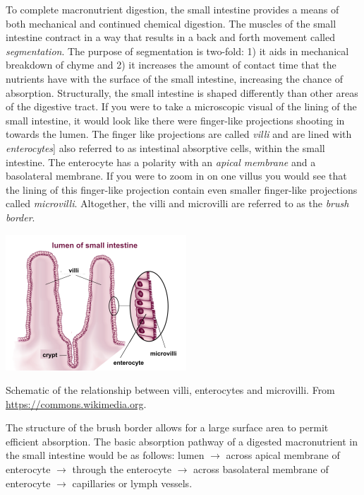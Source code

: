 \documentclass{tufte-handout}
\begin{document}
To complete macronutrient digestion, the small intestine provides a means of both mechanical and continued chemical digestion. The muscles of the small intestine contract in a way that results in a back and forth movement called \emph{segmentation}. The purpose of segmentation is two-fold: 1) it aids in mechanical breakdown of chyme and 2) it increases the amount of contact time that the nutrients have with the surface of the small intestine, increasing the chance of absorption. Structurally, the small intestine is shaped differently than other areas of the digestive tract. If you were to take a microscopic visual of the lining of the small intestine, it would look like there were finger-like projections shooting in towards the lumen. The finger like projections are called \emph{villi} and are lined with \emph{enterocytes}] also referred to as intestinal absorptive cells, within the small intestine. The enterocyte has a polarity with an \emph{apical membrane} and a basolateral membrane. If you were to zoom in on one villus you would see that the lining of this finger-like projection contain even smaller finger-like projections called \emph{microvilli}. Altogether, the villi and microvilli are referred to as the \emph{brush border}.

\begin{marginfigure}
\includegraphics{figures/enterocyte-villi.png}
\caption{Schematic of the relationship between villi, enterocytes and microvilli.  From \url{https://commons.wikimedia.org}.}
\end{marginfigure}

The structure of the brush border allows for a large surface area to permit efficient absorption. The basic absorption pathway of a digested macronutrient in the small intestine would be as follows: lumen $\rightarrow$ across apical membrane of enterocyte $\rightarrow$ through the enterocyte $\rightarrow$ across basolateral membrane of enterocyte $\rightarrow$ capillaries or lymph vessels.   
\end{document}
